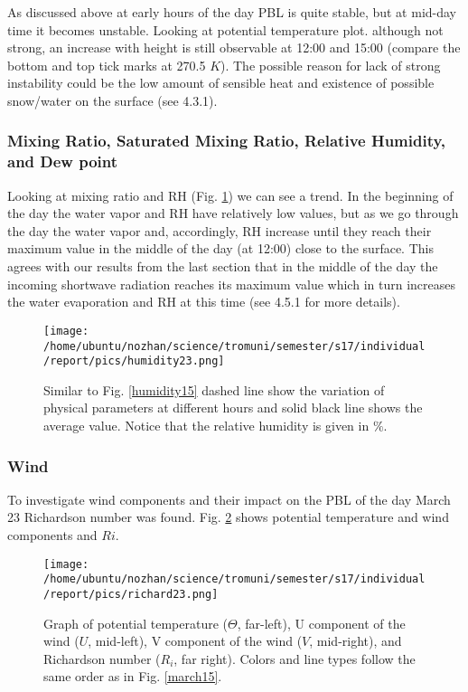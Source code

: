 \documentclass[a4paper,12pt]{article}
\numberwithin{equation}{section} %
\begin{document}
As discussed above at early hours of the day PBL is quite stable, but at mid-day time it becomes unstable. Looking at potential temperature plot. although not strong, an increase with height is still observable at 12:00 and 15:00 (compare the bottom and top tick marks at 270.5 $K$). The possible reason for lack of strong instability could be the low amount of sensible heat and existence of possible snow/water on the surface (see 4.3.1).

\subsubsection{Mixing Ratio, Saturated Mixing Ratio, Relative Humidity, and Dew point}

Looking at mixing ratio and RH (Fig. \ref{humidity23}) we can see a trend. In the beginning of the day the water vapor and RH have relatively low values, but as we go through the day the water vapor and, accordingly, RH increase until they reach their maximum value in the middle of the day (at 12:00) close to the surface. This agrees with our results from the last section that in the middle of the day the incoming shortwave radiation reaches its maximum value which in turn increases the water evaporation and RH at this time (see 4.5.1 for more details).


\begin{figure}[bhp]
\texttt{[image: /home/ubuntu/nozhan/science/tromuni/semester/s17/individual/report/pics/humidity23.png]}
\caption{Similar to Fig. \ref{humidity15} dashed line show the variation of physical parameters at different hours and solid black line shows the average value. Notice that the relative humidity is given in $\%$.}
\label{humidity23}
\end{figure}

\subsubsection{Wind}

To investigate wind components and their impact on the PBL of the day March 23 Richardson number was found. Fig. \ref{richard23} shows potential temperature and wind components and $Ri$. 

\begin{figure}[bhp]
\texttt{[image: /home/ubuntu/nozhan/science/tromuni/semester/s17/individual/report/pics/richard23.png]}
\caption{Graph of potential temperature ($\Theta$, far-left), U component of the wind ($U$, mid-left), V component of the wind ($V$, mid-right), and Richardson number ($R_i$, far right). Colors and line types follow the same order as in Fig. \ref{march15}.}
\label{richard23}
\end{figure}
\end{document}
